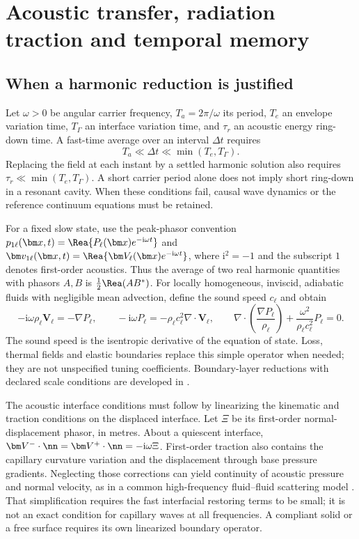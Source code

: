 \section{Acoustic transfer, radiation traction and temporal memory}\label{sec:acoustics}

\subsection{When a harmonic reduction is justified}
Let $\omega>0$ be angular carrier frequency, $T_a=2\pi/\omega$ its period,
$T_e$ an envelope variation time, $T_\Gamma$ an interface variation time, and
$\tau_r$ an acoustic energy ring-down time. A fast-time average over an interval
$\Delta t$ requires
\begin{equation}
 T_a\ll\Delta t\ll\min(T_e,T_\Gamma).
 \label{eq:averaging-separation}
\end{equation}
Replacing the field at each instant by a settled harmonic solution also requires
$\tau_r\ll\min(T_e,T_\Gamma)$. A short carrier period alone does not imply
short ring-down in a resonant cavity. When these conditions fail, causal wave
dynamics or the reference continuum equations must be retained.

For a fixed slow state, use the peak-phasor convention
$p_{1\ell}(\bm x,t)=\Rea\{P_\ell(\bm x)e^{-\mathrm i\omega t}\}$ and
$\bm v_{1\ell}(\bm x,t)=\Rea\{\bm V_\ell(\bm x)e^{-\mathrm i\omega t}\}$,
where $\mathrm i^2=-1$ and the subscript $1$ denotes first-order acoustics.
Thus the average of two real harmonic quantities with phasors $A,B$ is
$\frac12\Rea(AB^*)$. For locally homogeneous, inviscid, adiabatic fluids with
negligible mean advection, define the sound speed $c_\ell$ and obtain
\begin{equation}
 -\mathrm i\omega\rho_\ell\bm V_\ell=-\nabla P_\ell,\qquad
 -\mathrm i\omega P_\ell=-\rho_\ell c_\ell^2\nabla\cdot\bm V_\ell,
 \qquad
 \nabla\cdot\left(\frac{\nabla P_\ell}{\rho_\ell}\right)
       +\frac{\omega^2}{\rho_\ell c_\ell^2}P_\ell=0.
 \label{eq:linear-acoustics}
\end{equation}
The sound speed is the isentropic derivative of the equation of state. Loss,
thermal fields and elastic boundaries replace this simple operator when
needed; they are not unspecified tuning coefficients. Boundary-layer
reductions with declared scale conditions are developed in
\cite{bach2018,jorgensen2021}.

The acoustic interface conditions must follow by linearizing the kinematic and
traction conditions on the displaced interface. Let $\Xi$ be its first-order
normal-displacement phasor, in metres. About a quiescent interface,
$\bm V^-\cdot\nn=\bm V^+\cdot\nn=-\mathrm i\omega\Xi$. First-order traction
also contains the capillary curvature variation and the displacement through
base pressure gradients. Neglecting those corrections can yield continuity
of acoustic pressure and normal velocity, as in a common high-frequency
fluid--fluid scattering model \cite{chesneau2022}. That simplification requires
the fast interfacial restoring terms to be small; it is not an exact condition
for capillary waves at all frequencies. A compliant solid or a free surface
requires its own linearized boundary operator.

